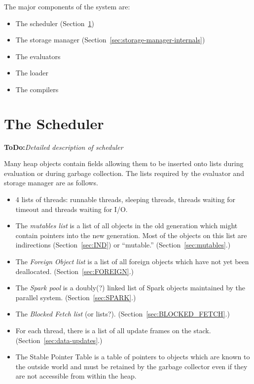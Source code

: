 \documentclass[11pt]{article}
\newcommand{\ToDo}[1]{{{\bf ToDo:}\sl #1}}
\newcommand{\secref}[1]{Section~\ref{sec:#1}}
\newcommand{\Section}[2]{\section{#1}\label{sec:#2}}
\begin{document}
The major components of the system are:
\begin{itemize}
\item The scheduler (\secref{scheduler-internals})
\item The storage manager (\secref{storage-manager-internals})
\item The evaluators
\item The loader
\item The compilers
\end{itemize}

\Section{The Scheduler}{scheduler-internals}

\ToDo{Detailed description of scheduler}

Many heap objects contain fields allowing them to be inserted onto lists
during evaluation or during garbage collection. The lists required by
the evaluator and storage manager are as follows.

\begin{itemize}

\item 4 lists of threads: runnable threads, sleeping threads, threads
waiting for timeout and threads waiting for I/O.

\item The \emph{mutables list} is a list of all objects in the old
generation which might contain pointers into the new generation.  Most
of the objects on this list are indirections (\secref{IND})
or ``mutable.''  (\secref{mutables}.)

\item The \emph{Foreign Object list} is a list of all foreign objects
 which have not yet been deallocated. (\secref{FOREIGN}.)

\item The \emph{Spark pool} is a doubly(?) linked list of Spark objects
maintained by the parallel system.  (\secref{SPARK}.)

\item The \emph{Blocked Fetch list} (or
lists?). (\secref{BLOCKED_FETCH}.)

\item For each thread, there is a list of all update frames on the
stack.  (\secref{data-updates}.)

\item The Stable Pointer Table is a table of pointers to objects which
are known to the outside world and must be retained by the garbage
collector even if they are not accessible from within the heap.

\end{itemize}
\end{document}
